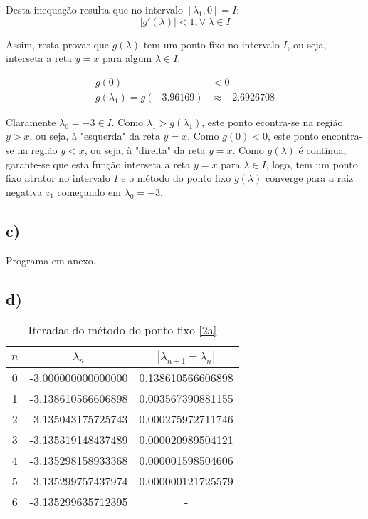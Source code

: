 \documentclass[a4paper, 18pt]{article}
\begin{document}
	Desta inequação resulta que no intervalo $[\lambda_1, 0] = I$:
		$$|g'(\lambda)| < 1, \forall \> \lambda \in I$$

	\par
	Assim, resta provar que $g(\lambda)$ tem um ponto fixo no intervalo $I$, ou seja, interseta a reta $y = x$ para algum $\lambda \in I$.

	\begin{align*}
		g(0) &< 0 \\
		g(\lambda_1) = g(-3.96169) &\approx -2.6926708
	\end{align*}

	Claramente $\lambda_0 = -3 \in I$. Como $\lambda_1 > g(\lambda_1)$, este ponto econtra-se na região $y > x$, ou seja, à "esquerda" da reta $y = x$. Como $g(0) < 0$, este ponto encontra-se na região $y < x$, ou seja, à "direita" da reta $y = x$. Como $g(\lambda)$ é contínua, garante-se que esta função interseta a reta $y = x$ para $\lambda \in I$, logo, tem um ponto fixo atrator no intervalo $I$ e o método do ponto fixo $g(\lambda)$ converge para a raiz negativa $z_1$ começando em $\lambda_0 = -3$.

\subsection*{c)}
	Programa em anexo.

\subsection*{d)}
	\begin{table}[H]
		\setlength{\tabcolsep}{0.5cm} %
		\renewcommand{\arraystretch}{1.5} %
		\centering
		\caption{Iteradas do método do ponto fixo \eqref{2a}}
		\label{2d_table}
		\begin{tabular}{|c|c|c|}
			$n$ & $\lambda _n$ &  $| \lambda _{n+1} - \lambda _n |$ \\\hline
			0& -3.000000000000000 & 0.138610566606898 \\
			1& -3.138610566606898 & 0.003567390881155 \\
			2& -3.135043175725743 & 0.000275972711746 \\
			3& -3.135319148437489 & 0.000020989504121 \\
			4& -3.135298158933368 & 0.000001598504606 \\
			5& -3.135299757437974 & 0.000000121725579 \\
			6& -3.135299635712395 & - \\
		\end{tabular}
	\end{table}
\end{document}
